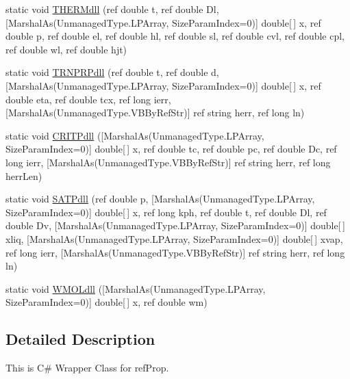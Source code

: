 \begin{DoxyCompactItemize}
\item 
static void \hyperlink{class_m_c_s_1_1_i_ref_prop64_ad29871572cfade99eb9e9ee443740b17}{T\+H\+E\+R\+Mdll} (ref double t, ref double Dl, \mbox{[}Marshal\+As(Unmanaged\+Type.\+L\+P\+Array, Size\+Param\+Index=0)\mbox{]} double\mbox{[}$\,$\mbox{]} x, ref double p, ref double el, ref double hl, ref double sl, ref double cvl, ref double cpl, ref double wl, ref double hjt)
\item 
static void \hyperlink{class_m_c_s_1_1_i_ref_prop64_a443a319f052304a628770d0f80bfe3b0}{T\+R\+N\+P\+R\+Pdll} (ref double t, ref double d, \mbox{[}Marshal\+As(Unmanaged\+Type.\+L\+P\+Array, Size\+Param\+Index=0)\mbox{]} double\mbox{[}$\,$\mbox{]} x, ref double eta, ref double tcx, ref long ierr, \mbox{[}Marshal\+As(Unmanaged\+Type.\+V\+B\+By\+Ref\+Str)\mbox{]} ref string herr, ref long ln)
\item 
static void \hyperlink{class_m_c_s_1_1_i_ref_prop64_a7310a40e63695fc9e8a8ab9248ed9fc7}{C\+R\+I\+T\+Pdll} (\mbox{[}Marshal\+As(Unmanaged\+Type.\+L\+P\+Array, Size\+Param\+Index=0)\mbox{]} double\mbox{[}$\,$\mbox{]} x, ref double tc, ref double pc, ref double Dc, ref long ierr, \mbox{[}Marshal\+As(Unmanaged\+Type.\+V\+B\+By\+Ref\+Str)\mbox{]} ref string herr, ref long herr\+Len)
\item 
static void \hyperlink{class_m_c_s_1_1_i_ref_prop64_aec0d80ac48b63f419b15fb52f7c458b5}{S\+A\+T\+Pdll} (ref double p, \mbox{[}Marshal\+As(Unmanaged\+Type.\+L\+P\+Array, Size\+Param\+Index=0)\mbox{]} double\mbox{[}$\,$\mbox{]} x, ref long kph, ref double t, ref double Dl, ref double Dv, \mbox{[}Marshal\+As(Unmanaged\+Type.\+L\+P\+Array, Size\+Param\+Index=0)\mbox{]} double\mbox{[}$\,$\mbox{]} xliq, \mbox{[}Marshal\+As(Unmanaged\+Type.\+L\+P\+Array, Size\+Param\+Index=0)\mbox{]} double\mbox{[}$\,$\mbox{]} xvap, ref long ierr, \mbox{[}Marshal\+As(Unmanaged\+Type.\+V\+B\+By\+Ref\+Str)\mbox{]} ref string herr, ref long ln)
\item 
static void \hyperlink{class_m_c_s_1_1_i_ref_prop64_a7d1ce17eb19e761258b50e89d61d332c}{W\+M\+O\+Ldll} (\mbox{[}Marshal\+As(Unmanaged\+Type.\+L\+P\+Array, Size\+Param\+Index=0)\mbox{]} double\mbox{[}$\,$\mbox{]} x, ref double wm)
\end{DoxyCompactItemize}


\subsection{Detailed Description}
This is C\# Wrapper Class for ref\+Prop. 

